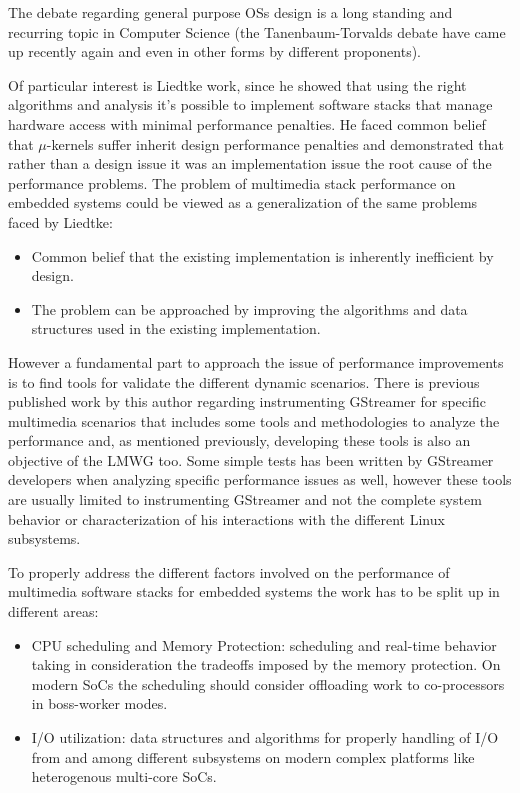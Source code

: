 The debate regarding general purpose \aclp{OS} design is a long standing and recurring topic in Computer Science (the Tanenbaum-Torvalds debate \cite{DiBona:1999:OSV:553109} have came up recently again\cite{Tanenbaum:fk} and even in other forms by different proponents\cite{Heiser:uq}). 

Of particular interest is Liedtke\citep{Liedtke:1995kx} work, since he showed that using the right algorithms and analysis it's possible to implement software stacks that manage hardware access with minimal performance penalties. He faced common belief that $\mu$-kernels suffer inherit design performance penalties and demonstrated that rather than a design issue it was an implementation issue the root cause of the performance problems. The problem of multimedia stack performance on embedded systems could be viewed as a generalization of the same problems faced by Liedtke:
\begin{itemize}
\item Common belief that the existing implementation is inherently inefficient by design.
\item The problem can be approached by improving the algorithms and data structures used in the existing implementation.
\end{itemize}

However a fundamental part to approach the issue of performance improvements is to find tools for validate the different dynamic scenarios. There is previous published work by this author regarding instrumenting GStreamer for specific multimedia scenarios\cite{Dompe:2011ys} that includes some tools and methodologies to analyze the performance and, as mentioned previously, developing these tools is also an objective of the \ac{LMWG} too. Some simple tests has been written by GStreamer developers when analyzing specific performance issues\cite{Contreras:vn} as well, however these tools are usually limited to instrumenting GStreamer and not the complete system behavior or characterization of his interactions with the different Linux subsystems.

To properly address the different factors involved on the performance of multimedia software stacks for embedded systems the work has to be split up in different areas:
\begin{itemize}
\item CPU scheduling and Memory Protection: scheduling and real-time behavior taking in consideration the tradeoffs imposed by the memory protection. On modern \acp{SoC} the scheduling should consider offloading work to co-processors in boss-worker modes.
\item I/O utilization: data structures and algorithms for properly handling of I/O from and among different subsystems on modern complex platforms like heterogenous multi-core \acp{SoC}.
\end{itemize}

